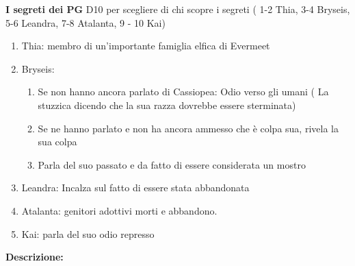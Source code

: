 \documentclass{article}
\begin{document}
    \textbf{I segreti dei PG}
    D10 per scegliere di chi scopre i segreti ( 1-2 Thia, 3-4 Bryseis, 5-6 Leandra, 7-8 Atalanta, 9 - 10 Kai)
    \begin{enumerate}
        \item Thia: membro di un'importante famiglia elfica di Evermeet
        \item Bryseis: \begin{enumerate}
            \item Se non hanno ancora parlato di Cassiopea: Odio verso gli umani ( La stuzzica dicendo che la sua razza dovrebbe essere sterminata)
            \item Se ne hanno parlato e non ha ancora ammesso che è colpa sua, rivela la sua colpa
            \item Parla del suo passato e da fatto di essere considerata un mostro
        \end{enumerate}
        \item Leandra: Incalza sul fatto di essere stata abbandonata
        \item Atalanta: genitori adottivi morti e abbandono.
        \item Kai: parla del suo odio represso
    \end{enumerate}
\textbf{Descrizione: }
\end{document}
